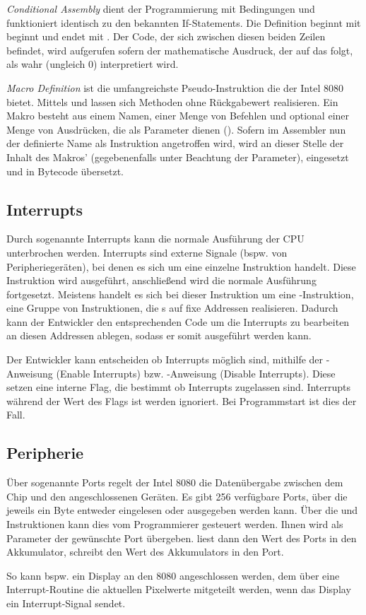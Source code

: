 \textit{Conditional Assembly} dient der Programmierung mit Bedingungen und funktioniert identisch zu den bekannten If-Statements. Die Definition beginnt mit  beginnt und endet mit . Der Code, der sich zwischen diesen beiden Zeilen befindet, wird aufgerufen sofern der mathematische Ausdruck, der auf das  folgt, als wahr (ungleich 0) interpretiert wird.

\textit{Macro Definition} ist die umfangreichste Pseudo-Instruktion die der Intel 8080 bietet. Mittels  und  lassen sich Methoden ohne Rückgabewert realisieren. Ein Makro besteht aus einem Namen, einer Menge von Befehlen und optional einer Menge von Ausdrücken, die als Parameter dienen (). Sofern im Assembler nun der definierte Name als Instruktion angetroffen wird, wird an dieser Stelle der Inhalt des Makros' (gegebenenfalls unter Beachtung der Parameter), eingesetzt und in Bytecode übersetzt.

\subsection{Interrupts}

Durch sogenannte Interrupts kann die normale Ausführung der CPU unterbrochen werden. Interrupts sind externe Signale (bspw. von Peripheriegeräten), bei denen es sich um eine einzelne Instruktion handelt. Diese Instruktion wird ausgeführt, anschließend wird die normale Ausführung fortgesetzt. Meistens handelt es sich bei dieser Instruktion um eine -Instruktion, eine Gruppe von Instruktionen, die s auf fixe Addressen realisieren. Dadurch kann der Entwickler den entsprechenden Code um die Interrupts zu bearbeiten an diesen Addressen ablegen, sodass er somit ausgeführt werden kann.

Der Entwickler kann entscheiden ob Interrupts möglich sind, mithilfe der -Anweisung (Enable Interrupts) bzw. -Anweisung (Disable Interrupts). Diese setzen eine interne Flag, die bestimmt ob Interrupts zugelassen sind. Interrupts während der Wert des Flags  ist werden ignoriert. Bei Programmstart ist dies der Fall.

\subsection{Peripherie}

Über sogenannte Ports regelt der Intel 8080 die Datenübergabe zwischen dem Chip und den angeschlossenen Geräten. 
Es gibt 256 verfügbare Ports, über die jeweils ein Byte entweder eingelesen oder ausgegeben werden kann. Über die  und  Instruktionen kann dies vom Programmierer gesteuert werden. Ihnen wird als Parameter der gewünschte Port übergeben.  liest dann den Wert des Ports in den Akkumulator,  schreibt den Wert des Akkumulators in den Port.

So kann bspw. ein Display an den 8080 angeschlossen werden, dem über eine Interrupt-Routine die aktuellen Pixelwerte mitgeteilt werden, wenn das Display ein Interrupt-Signal sendet.
